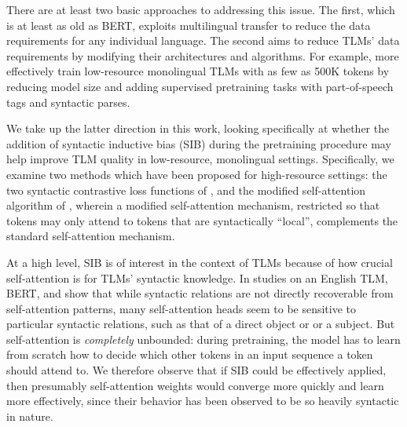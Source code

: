 \documentclass[11pt]{article}
\begin{document}
There are at least two basic approaches to addressing this issue.
The first, which is at least as old as BERT, exploits multilingual transfer to reduce the data requirements for any individual language. %
The second aims to reduce TLMs' data requirements by modifying their architectures and algorithms.
For example, \citet{gessler-zeldes-2022-microbert} more effectively train low-resource monolingual TLMs with as few as 500K tokens by reducing model size and adding supervised pretraining tasks with part-of-speech tags and syntactic parses.

We take up the latter direction in this work, looking specifically at whether the addition of syntactic inductive bias (SIB) during the pretraining procedure may help improve TLM quality in low-resource, monolingual settings.
Specifically, we examine two methods which have been proposed for high-resource settings: the two syntactic contrastive loss functions of \citet{zhang-etal-2022-syntax}, and the modified self-attention algorithm of \citet{li-etal-2021-improving-bert}, wherein a modified self-attention mechanism, restricted so that tokens may only attend to tokens that are syntactically ``local'', complements the standard self-attention mechanism.

At a high level, SIB is of interest in the context of TLMs because of how crucial self-attention is for TLMs' syntactic knowledge.
In studies on an English TLM, BERT, \citet{htut2019} and \citet{clark-etal-2019-bert} show that while syntactic relations are not directly recoverable from self-attention patterns, many self-attention heads seem to be sensitive to particular syntactic relations, such as that of a direct object or or a subject.
But self-attention is \textit{completely} unbounded: during pretraining, the model has to learn from scratch how to decide which other tokens in an input sequence a token should attend to.
We therefore observe that if SIB could be effectively applied, then presumably self-attention weights would converge more quickly and learn more effectively, since their behavior has been observed to be so heavily syntactic in nature.
\end{document}
